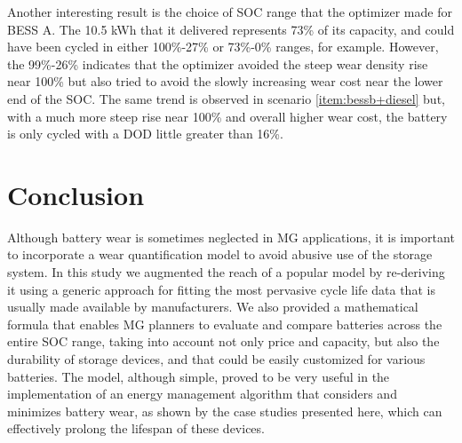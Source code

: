 \documentclass{ieeeaccess}
\begin{document}
    Another interesting result is the choice of \ac{SOC} range that the optimizer made for \ac{BESS} A. The 10.5 kWh that it delivered represents 73\% of its capacity, and could have been cycled in either 100\%-27\% or 73\%-0\% ranges, for example. However, the 99\%-26\% indicates that the optimizer avoided the steep wear density rise near 100\% but also tried to avoid the slowly increasing wear cost near the lower end of the \ac{SOC}. The same trend is observed in scenario \ref{item:bessb+diesel} but, with a much more steep rise near 100\% and overall higher wear cost, the battery is only cycled with a \ac{DOD} little greater than 16\%.

    \section{Conclusion}
    Although battery wear is sometimes neglected in \ac{MG} applications, it is important to incorporate a wear quantification model to avoid abusive use of the storage system. In this study we augmented the reach of a popular model by re-deriving it using a generic approach for fitting the most pervasive cycle life data that is usually made available by manufacturers. We also provided a mathematical formula that enables \ac{MG} planners to evaluate and compare batteries across the entire \ac{SOC} range, taking into account not only price and capacity, but also the durability of storage devices, and that could be easily customized for various batteries. The model, although simple, proved to be very useful in the implementation of an energy management algorithm that considers and minimizes battery wear, as shown by the case studies presented here, which can effectively prolong the lifespan of these devices.

    
    

\EOD
\end{document}
